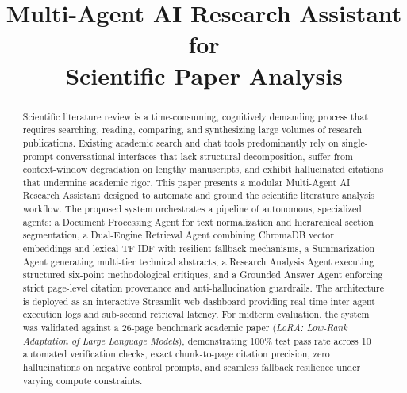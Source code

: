 \documentclass[conference]{IEEEtran}
\begin{document}
\title{Multi-Agent AI Research Assistant for\\Scientific Paper Analysis}

\author{
\and
{}
\and
{}
}

\maketitle

\begin{abstract}
Scientific literature review is a time-consuming, cognitively demanding process that requires searching, reading, comparing, and synthesizing large volumes of research publications. Existing academic search and chat tools predominantly rely on single-prompt conversational interfaces that lack structural decomposition, suffer from context-window degradation on lengthy manuscripts, and exhibit hallucinated citations that undermine academic rigor. This paper presents a modular Multi-Agent AI Research Assistant designed to automate and ground the scientific literature analysis workflow. The proposed system orchestrates a pipeline of autonomous, specialized agents: a Document Processing Agent for text normalization and hierarchical section segmentation, a Dual-Engine Retrieval Agent combining ChromaDB vector embeddings and lexical TF-IDF with resilient fallback mechanisms, a Summarization Agent generating multi-tier technical abstracts, a Research Analysis Agent executing structured six-point methodological critiques, and a Grounded Answer Agent enforcing strict page-level citation provenance and anti-hallucination guardrails. The architecture is deployed as an interactive Streamlit web dashboard providing real-time inter-agent execution logs and sub-second retrieval latency. For midterm evaluation, the system was validated against a 26-page benchmark academic paper (\textit{LoRA: Low-Rank Adaptation of Large Language Models}), demonstrating 100\% test pass rate across 10 automated verification checks, exact chunk-to-page citation precision, zero hallucinations on negative control prompts, and seamless fallback resilience under varying compute constraints.
\end{abstract}
\end{document}
